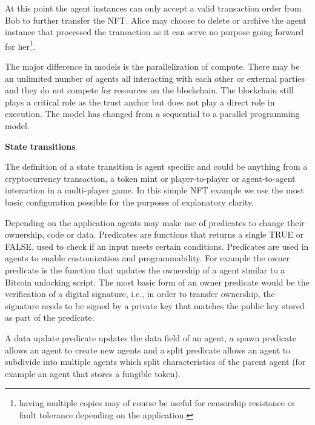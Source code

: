 \documentclass{article}
\begin{document}
At this point the agent instances can only accept a valid transaction order from Bob to further transfer the NFT. Alice may choose to delete or archive the agent instance that processed the transaction as it can serve no purpose going forward for her\footnote{having multiple copies may of course be useful for censorship resistance or fault tolerance depending on the application.}. 

\vspace{2mm}

The major difference in models is the parallelization of compute. There may be an unlimited number of agents all interacting with each other or external parties and they do not compete for resources on the blockchain. The blockchain still plays a critical role as the trust anchor but does not play a direct role in execution. The model has changed from a sequential to a parallel programming model.
\vspace{2mm}

\textbf{State transitions}
\vspace{2mm}


The definition of a state transition is agent specific and could be anything from a cryptocurrency transaction, a token mint or player-to-player or agent-to-agent interaction in a multi-player game. In this simple NFT example we use the most basic configuration possible for the purposes of explanatory clarity.
\vspace{2mm}

Depending on the application agents may make use of predicates to change their ownership, code or data. Predicates are functions that returns a single TRUE or FALSE, used to check if an input meets certain conditions. Predicates are used in agents to enable customization and programmability. For example the owner predicate is the function that updates the ownership of a agent similar to a Bitcoin unlocking script. The most basic form of an owner predicate would be the verification of a digital signature, i.e., in order to transfer ownership, the signature needs to be signed by a private key that matches the public key stored as part of the predicate.
\vspace{2mm}

A data update predicate updates the data field of an agent, a spawn predicate allows an agent to create new agents and a split predicate allows an agent to subdivide into multiple agents which split characteristics of the parent agent (for example an agent that stores a fungible token).
\vspace{2mm}
\end{document}
